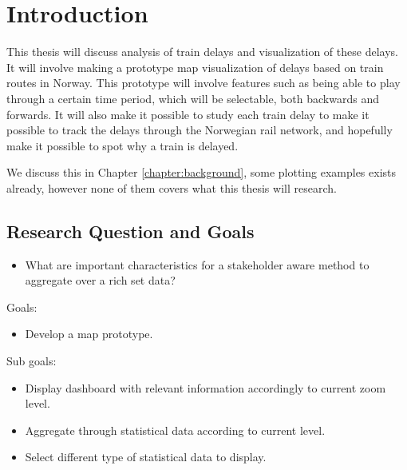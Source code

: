 
\chapter{Introduction}
\label{chapter:introduction}

This thesis will discuss analysis of train delays and visualization of these
delays. It will involve making a prototype map visualization of delays based on
train routes in Norway. This prototype will involve features such as being able
to play through a certain time period, which will be selectable, both backwards
and forwards. It will also make it possible to study each train delay to make
it possible to track the delays through the Norwegian rail network, and
hopefully make it possible to spot why a train is delayed.

We discuss this in Chapter \vref{chapter:background}, some plotting 
examples exists already, however none of them covers what this thesis will 
research.

\section{Research Question and Goals} %
\label{sec:intro_research_question}
\begin{itemize}
	\item What are important characteristics for a stakeholder aware method to 
	aggregate over a rich set data?
\end{itemize}

Goals:

\begin{itemize}
	\item Develop a map prototype.
\end{itemize}

Sub goals:

\begin{itemize}
	\item Display dashboard with relevant information accordingly to current zoom level.
	\item Aggregate through statistical data according to current level.
	\item Select different type of statistical data to display.
\end{itemize}

\clearpage
